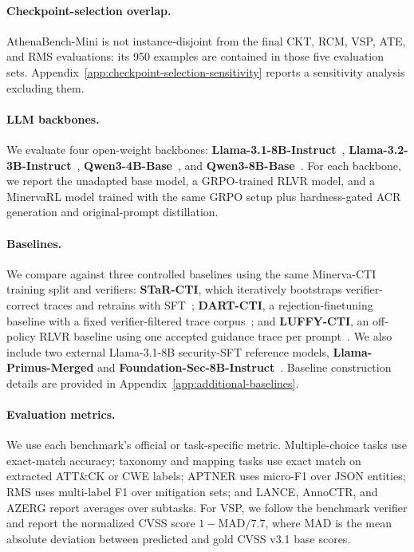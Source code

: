 \paragraph{Checkpoint-selection overlap.}
AthenaBench-Mini is not instance-disjoint from the final CKT, RCM, VSP, ATE, and RMS evaluations: its 950 examples are contained in those five evaluation sets. Appendix~\ref{app:checkpoint-selection-sensitivity} reports a sensitivity analysis excluding them.

\paragraph{LLM backbones.}
We evaluate four open-weight backbones: \textbf{Llama-3.1-8B-Instruct}~\citep{llama31_8b_instruct}, \textbf{Llama-3.2-3B-Instruct}~\citep{llama32_3b_instruct}, \textbf{Qwen3-4B-Base}~\citep{qwen3_4b_base}, and \textbf{Qwen3-8B-Base}~\citep{qwen3_8b_base}. For each backbone, we report the unadapted base model, a GRPO-trained RLVR model, and a MinervaRL model trained with the same GRPO setup plus hardness-gated ACR generation and original-prompt distillation.

\paragraph{Baselines.}
We compare against three controlled baselines using the same Minerva-CTI training split and verifiers: \textbf{STaR-CTI}, which iteratively bootstraps verifier-correct traces and retrains with SFT~\citep{NEURIPS2022_639a9a17}; \textbf{DART-CTI}, a rejection-finetuning baseline with a fixed verifier-filtered trace corpus~\citep{NEURIPS2024_0ef1afa0}; and \textbf{LUFFY-CTI}, an off-policy RLVR baseline using one accepted guidance trace per prompt~\citep{yan2025luffy}. We also include two external Llama-3.1-8B security-SFT reference models, \textbf{Llama-Primus-Merged} and \textbf{Foundation-Sec-8B-Instruct}~\citep{llama_primus_merged,foundation_sec_8b_instruct}. Baseline construction details are provided in Appendix~\ref{app:additional-baselines}.

\paragraph{Evaluation metrics.}
We use each benchmark's official or task-specific metric. Multiple-choice tasks use exact-match accuracy; taxonomy and mapping tasks use exact match on extracted ATT\&CK or CWE labels; APTNER uses micro-F1 over JSON entities; RMS uses multi-label F1 over mitigation sets; and LANCE, AnnoCTR, and AZERG report averages over subtasks. For VSP, we follow the benchmark verifier and report the normalized CVSS score $1-\mathrm{MAD}/7.7$, where $\mathrm{MAD}$ is the mean absolute deviation between predicted and gold CVSS v3.1 base scores.


